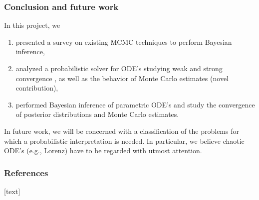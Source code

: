\documentclass{beamer}
\begin{document}
\begin{frame}
	\frametitle{Conclusion and future work}
	
	In this project, we 
	\begin{enumerate}
		\item presented a survey on existing MCMC techniques to perform Bayesian inference,
		\item analyzed a probabilistic solver for ODE's studying weak and strong convergence \cite{CGS16}, as well as the behavior of Monte Carlo estimates (novel contribution),
		\item performed Bayesian inference of parametric ODE's and study the convergence of posterior distributions and Monte Carlo estimates.
	\end{enumerate}
	In future work, we will be concerned with a classification of the problems for which a probabilistic interpretation is needed. In particular, we believe chaotic ODE's (e.g., Lorenz) have to be regarded with utmost attention.
\end{frame}

\appendix
\begin{frame}[allowframebreaks]
	\frametitle{References}
	
	[text]
	
	
\end{frame}
\end{document}
